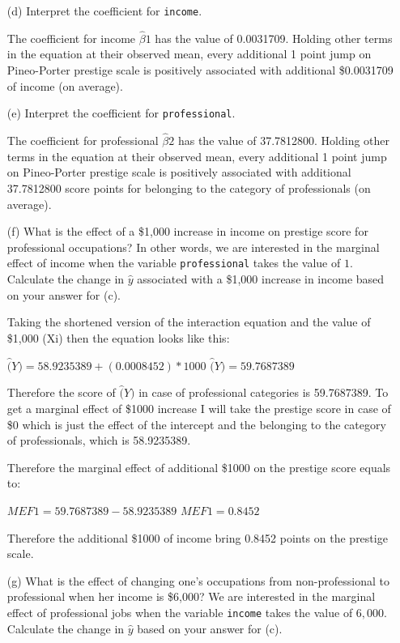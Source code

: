 \documentclass[12pt,letterpaper]{article}
\begin{document}
\begin{enumerate}
\newpage
	\item [(d)]
	Interpret the coefficient for \texttt{income}.
	
	The coefficient for income $\hat{\beta}1$ has the value of 0.0031709. Holding other terms in the equation at their observed mean, every additional 1 point jump on Pineo-Porter prestige scale is positively associated with additional \$0.0031709 of income (on average).     
	
	\vspace{1cm}	
	\item [(e)]
	Interpret the coefficient for \texttt{professional}.
	
	The coefficient for professional $\hat{\beta}2$ has the value of 37.7812800. Holding other terms in the equation at their observed mean, every additional 1 point jump on Pineo-Porter prestige scale is positively associated with additional 37.7812800 score points for belonging to the category of professionals (on average). 
	
	\newpage
	\item [(f)]
	What is the effect of a \$1,000 increase in income on prestige score for professional occupations? In other words, we are interested in the marginal effect of income when the variable \texttt{professional} takes the value of $1$. Calculate the change in $\hat{y}$ associated with a \$1,000 increase in income based on your answer for (c).
	
	Taking the shortened version of the interaction equation and the value of \$1,000 (Xi) then the equation looks like this: 
	
	$\hat(Y) = 58.9235389 + (0.0008452)*1000$
	$\hat(Y) = 59.7687389$
	
	Therefore the score of $\hat(Y)$ in case of professional categories is 59.7687389. To get a marginal effect of \$1000 increase I will take the prestige score in case of \$0 which is just the effect of the intercept and the belonging to the category of professionals, which is 58.9235389.  
	
	Therefore the marginal effect of additional \$1000 on the prestige score equals to: 
	
	$MEF1 = 59.7687389 - 58.9235389$
	$MEF1 = 0.8452$
	
	Therefore the additional \$1000 of income bring 0.8452 points on the prestige scale. 
	
	
	\vspace{1cm}
	
	
	\item [(g)]
	What is the effect of changing one's occupations from non-professional to professional when her income is \$6,000? We are interested in the marginal effect of professional jobs when the variable \texttt{income} takes the value of $6,000$. Calculate the change in $\hat{y}$ based on your answer for (c).
	

\end{enumerate}
\end{document}
